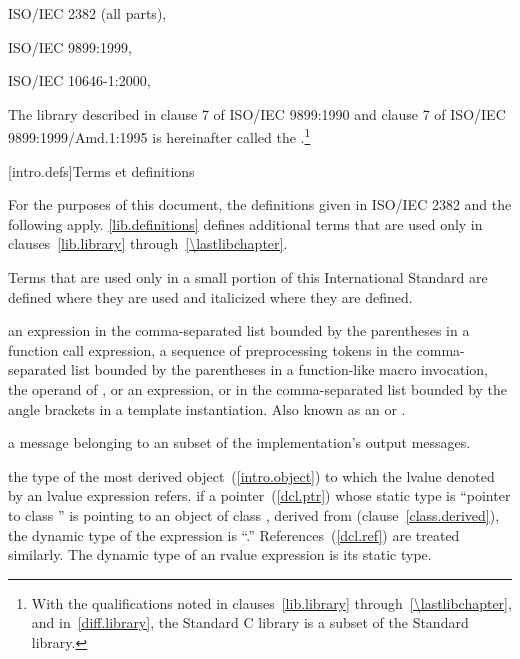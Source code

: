 ISO/IEC 2382 (all parts), 

ISO/IEC 9899:1999, 

ISO/IEC 10646-1:2000, 

\pnum
The library described in clause 7 of ISO/IEC 9899:1990 and clause 7 of
ISO/IEC 9899:1999/Amd.1:1995 is hereinafter called the
.\footnote{With the qualifications noted in clauses~\ref{lib.library}
through~\ref{\lastlibchapter}, and in~\ref{diff.library}, the Standard
C library is a subset of the Standard \Cpp library.}

[intro.defs]{Terms et definitions}

%
For the purposes of this document, the definitions given in
ISO/IEC 2382 and the following apply.
\ref{lib.definitions}
defines additional terms that are used only in clauses~\ref{lib.library}
through~\ref{\lastlibchapter}.

\pnum
Terms that are used only in a small portion of this International
Standard are defined where they are used and italicized where they are
defined.

%
%
%
%
an expression in the comma-separated list bounded by the parentheses
in a function call expression,
a sequence of preprocessing tokens in the
comma-separated list bounded by the parentheses in a
function-like macro invocation,
the operand of ,
or an expression,
  or  in the comma-separated
list bounded by the angle brackets in a template instantiation.
Also known as an
 or
.

%
a message belonging to an  subset of the
implementation's output messages.

%
the type of the most derived object~(\ref{intro.object}) to which the
lvalue denoted by an lvalue expression refers.
\enterexample
if a pointer~(\ref{dcl.ptr})  whose static type is ``pointer to
class '' is pointing to an object of class , derived
from  (clause~\ref{class.derived}), the dynamic type of the
expression  is ``.'' References~(\ref{dcl.ref}) are
treated similarly.
\exitexample
The dynamic type of an rvalue expression is its static type.

